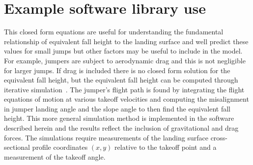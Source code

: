 \documentclass{article}
\begin{document}
\section{Example software library use}
%
This closed form equations are useful for understanding the fundamental
relationship of equivalent fall height to the landing surface and well predict
these values for small jumps but other factors may be useful to include in the
model. For example, jumpers are subject to aerodynamic drag and this is not
negligible for larger jumps. If drag is included there is no closed form
solution for the equivalent fall height, but the equivalent fall height can be
computed through iterative simulation~\cite{Levy2015}. The jumper's flight path
is found by integrating the flight equations of motion at various takeoff
velocities and computing the misalignment in jumper landing angle and the slope
angle to then find the equivalent fall height. This more general simulation
method is implemented in the software described herein and the results reflect
the inclusion of gravitational and drag forces. The simulations require
measurements of the landing surface cross-sectional profile coordinates $(x,y)$
relative to the takeoff point and a measurement of the takeoff angle.
\end{document}
